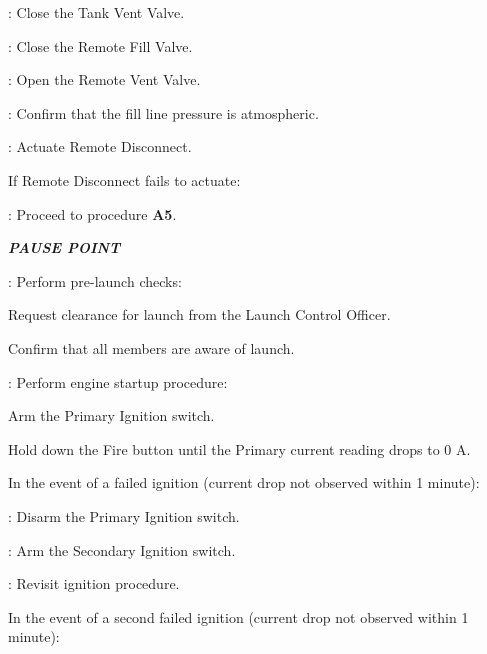 \begin{checklist}
\begin{checklist}
    \end{checklist}
    \item \control{}: Close the Tank Vent Valve.
    \item \control{}: Close the Remote Fill Valve.
    \item \control{}: Open the Remote Vent Valve.
    \item \control{}: Confirm that the fill line pressure is atmospheric.
    \item \control{}: Actuate Remote Disconnect.
     \begin{checklist}[label=$\bullet$]
        \item If Remote Disconnect fails to actuate:
        \begin{checklist}
            \item \ops{}: Proceed to procedure \textbf{A5}.
        \end{checklist}
    \end{checklist}
    \item \textbf{\textit{PAUSE POINT}}
    \item \ops: Perform pre-launch checks:
    \begin{checklist}
        \item Request clearance for launch from the Launch Control Officer.
        \item Confirm that all members are aware of launch.
    \end{checklist}    
    \item \primary{}: Perform engine startup procedure:
    \begin{checklist}
        \item Arm the Primary Ignition switch.
        \item Hold down the Fire button until the Primary current reading drops to 0 A.
        \begin{checklist}[label=$\bullet$]
            \item In the event of a failed ignition (current drop not observed within 1 minute):
            \begin{checklist}
                \item \primary: Disarm the Primary Ignition switch.
                \item \primary: Arm the Secondary Ignition switch.
                \item \ops: Revisit ignition procedure.
            \end{checklist}
            \item In the event of a second failed ignition (current drop not observed within 1 minute):

\end{checklist}
\end{checklist}
\end{checklist}
